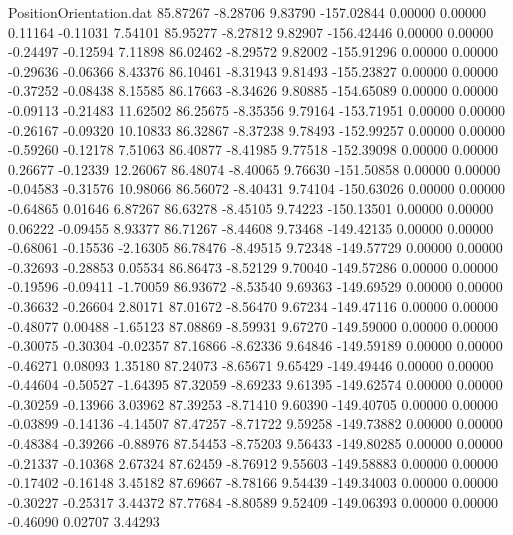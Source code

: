 \begin{filecontents}{PositionOrientation.dat}
  85.87267   -8.28706    9.83790  -157.02844    0.00000    0.00000    0.11164   -0.11031    7.54101
  85.95277   -8.27812    9.82907  -156.42446    0.00000    0.00000   -0.24497   -0.12594    7.11898
  86.02462   -8.29572    9.82002  -155.91296    0.00000    0.00000   -0.29636   -0.06366    8.43376
  86.10461   -8.31943    9.81493  -155.23827    0.00000    0.00000   -0.37252   -0.08438    8.15585
  86.17663   -8.34626    9.80885  -154.65089    0.00000    0.00000   -0.09113   -0.21483   11.62502
  86.25675   -8.35356    9.79164  -153.71951    0.00000    0.00000   -0.26167   -0.09320   10.10833
  86.32867   -8.37238    9.78493  -152.99257    0.00000    0.00000   -0.59260   -0.12178    7.51063
  86.40877   -8.41985    9.77518  -152.39098    0.00000    0.00000    0.26677   -0.12339   12.26067
  86.48074   -8.40065    9.76630  -151.50858    0.00000    0.00000   -0.04583   -0.31576   10.98066
  86.56072   -8.40431    9.74104  -150.63026    0.00000    0.00000   -0.64865    0.01646    6.87267
  86.63278   -8.45105    9.74223  -150.13501    0.00000    0.00000    0.06222   -0.09455    8.93377
  86.71267   -8.44608    9.73468  -149.42135    0.00000    0.00000   -0.68061   -0.15536   -2.16305
  86.78476   -8.49515    9.72348  -149.57729    0.00000    0.00000   -0.32693   -0.28853    0.05534
  86.86473   -8.52129    9.70040  -149.57286    0.00000    0.00000   -0.19596   -0.09411   -1.70059
  86.93672   -8.53540    9.69363  -149.69529    0.00000    0.00000   -0.36632   -0.26604    2.80171
  87.01672   -8.56470    9.67234  -149.47116    0.00000    0.00000   -0.48077    0.00488   -1.65123
  87.08869   -8.59931    9.67270  -149.59000    0.00000    0.00000   -0.30075   -0.30304   -0.02357
  87.16866   -8.62336    9.64846  -149.59189    0.00000    0.00000   -0.46271    0.08093    1.35180
  87.24073   -8.65671    9.65429  -149.49446    0.00000    0.00000   -0.44604   -0.50527   -1.64395
  87.32059   -8.69233    9.61395  -149.62574    0.00000    0.00000   -0.30259   -0.13966    3.03962
  87.39253   -8.71410    9.60390  -149.40705    0.00000    0.00000   -0.03899   -0.14136   -4.14507
  87.47257   -8.71722    9.59258  -149.73882    0.00000    0.00000   -0.48384   -0.39266   -0.88976
  87.54453   -8.75203    9.56433  -149.80285    0.00000    0.00000   -0.21337   -0.10368    2.67324
  87.62459   -8.76912    9.55603  -149.58883    0.00000    0.00000   -0.17402   -0.16148    3.45182
  87.69667   -8.78166    9.54439  -149.34003    0.00000    0.00000   -0.30227   -0.25317    3.44372
  87.77684   -8.80589    9.52409  -149.06393    0.00000    0.00000   -0.46090    0.02707    3.44293

\end{filecontents}
